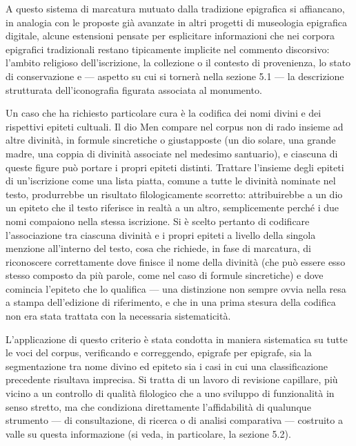 \documentclass[11pt,a4paper]{article}
\begin{document}
A questo sistema di marcatura mutuato dalla tradizione epigrafica si
affiancano, in analogia con le proposte già avanzate in altri progetti
di museologia epigrafica digitale, alcune estensioni pensate per
esplicitare informazioni che nei corpora epigrafici tradizionali
restano tipicamente implicite nel commento discorsivo: l'ambito
religioso dell'iscrizione, la collezione o il contesto di provenienza,
lo stato di conservazione e --- aspetto su cui si tornerà nella sezione
5.1 --- la descrizione strutturata dell'iconografia figurata associata
al monumento.

Un caso che ha richiesto particolare cura è la codifica dei nomi divini
e dei rispettivi epiteti cultuali. Il dio Men compare nel corpus non di
rado insieme ad altre divinità, in formule sincretiche o giustapposte
(un dio solare, una grande madre, una coppia di divinità associate nel
medesimo santuario), e ciascuna di queste figure può portare i propri
epiteti distinti. Trattare l'insieme degli epiteti di un'iscrizione come
una lista piatta, comune a tutte le divinità nominate nel testo,
produrrebbe un risultato filologicamente scorretto: attribuirebbe a un
dio un epiteto che il testo riferisce in realtà a un altro, semplicemente
perché i due nomi compaiono nella stessa iscrizione. Si è scelto
pertanto di codificare l'associazione tra ciascuna divinità e i propri
epiteti a livello della singola menzione all'interno del testo, cosa che
richiede, in fase di marcatura, di riconoscere correttamente dove finisce
il nome della divinità (che può essere esso stesso composto da più
parole, come nel caso di formule sincretiche) e dove comincia l'epiteto
che lo qualifica --- una distinzione non sempre ovvia nella resa a stampa
dell'edizione di riferimento, e che in una prima stesura della codifica
non era stata trattata con la necessaria sistematicità.

L'applicazione di questo criterio è stata condotta in maniera sistematica
su tutte le voci del corpus, verificando e correggendo, epigrafe per
epigrafe, sia la segmentazione tra nome divino ed epiteto sia i casi in
cui una classificazione precedente risultava imprecisa. Si tratta di un
lavoro di revisione capillare, più vicino a un controllo di qualità
filologico che a uno sviluppo di funzionalità in senso stretto, ma che
condiziona direttamente l'affidabilità di qualunque strumento --- di
consultazione, di ricerca o di analisi comparativa --- costruito a valle
su questa informazione (si veda, in particolare, la sezione 5.2).
\end{document}
